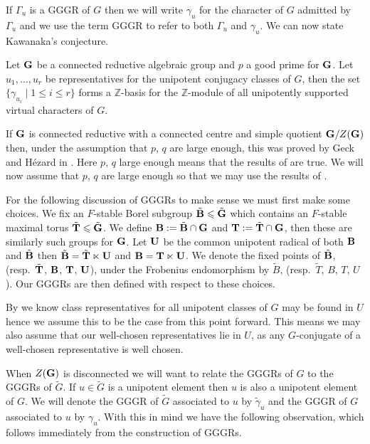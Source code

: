 \documentclass{jt-calcs}
\begin{document}
If $\Gamma_u$ is a GGGR of $G$ then we will write $\gamma_u$ for the character of $G$ admitted by $\Gamma_u$ and we use the term GGGR to refer to both $\Gamma_u$ and $\gamma_u$. We can now state Kawanaka's conjecture.

\begin{conj}\label{conj:kawanaka}
Let $\mathbf{G}$ be a connected reductive algebraic group and $p$ a good prime for $\mathbf{G}$. Let $u_1,\dots,u_r$ be representatives for the unipotent conjugacy classes of $G$, then the set $\{\gamma_{u_i} \mid 1 \leqslant i \leqslant r\}$ forms a $\mathbb{Z}$-basis for the $\mathbb{Z}$-module of all unipotently supported virtual characters of $G$.
\end{conj}

\noindent If $\mathbf{G}$ is connected reductive with a connected centre and simple quotient $\mathbf{G}/Z(\mathbf{G})$ then, under the assumption that $p$, $q$ are large enough, this was proved by Geck and H\'{e}zard in \cite[Theorem 4.5]{geck-hezard:2008:unipotent-support}. Here $p$, $q$ large enough means that the results of \cite{lusztig:1992:a-unipotent-support} are true. We will now assume that $p$, $q$ are large enough so that we may use the results of \cite{geck-hezard:2008:unipotent-support}.

For the following discussion of GGGRs to make sense we must first make some choices. We fix an $F$-stable Borel subgroup $\tilde{\mathbf{B}} \leqslant \tilde{\mathbf{G}}$ which contains an $F$-stable maximal torus $\tilde{\mathbf{T}} \leqslant \tilde{\mathbf{G}}$. We define $\mathbf{B} := \tilde{\mathbf{B}} \cap \mathbf{G}$ and $\mathbf{T} := \tilde{\mathbf{T}} \cap \mathbf{G}$, then these are similarly such groups for $\mathbf{G}$. Let $\mathbf{U}$ be the common unipotent radical of both $\mathbf{B}$ and $\tilde{\mathbf{B}}$ then $\tilde{\mathbf{B}} = \tilde{\mathbf{T}} \ltimes \mathbf{U}$ and $\mathbf{B} = \mathbf{T} \ltimes \mathbf{U}$. We denote the fixed points of $\tilde{\mathbf{B}}$, (resp.\ $\tilde{\mathbf{T}}$, $\mathbf{B}$, $\mathbf{T}$, $\mathbf{U}$), under the Frobenius endomorphism by $\tilde{B}$, (resp.\ $\tilde{T}$, $B$, $T$, $U$). Our GGGRs are then defined with respect to these choices.

\begin{rem}
By \cite[Remark 2.2]{geck:2004:on-the-schur-indices} we know class representatives for all unipotent classes of $G$ may be found in $U$ hence we assume this to be the case from this point forward. This means we may also assume that our well-chosen representatives lie in $U$, as any $G$-conjugate of a well-chosen representative is well chosen.
\end{rem}

When $Z(\mathbf{G})$ is disconnected we will want to relate the GGGRs of $G$ to the GGGRs of $\tilde{G}$. If $u \in \tilde{G}$ is a unipotent element then $u$ is also a unipotent element of $G$. We will denote the GGGR of $\tilde{G}$ associated to $u$ by $\tilde{\gamma}_u$ and the GGGR of $G$ associated to $u$ by $\gamma_u$. With this in mind we have the following observation, which follows immediately from the construction of GGGRs.
\end{document}
